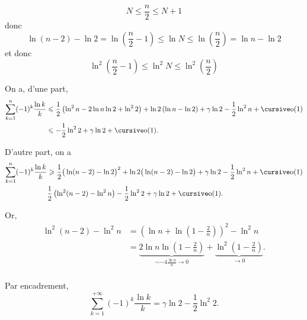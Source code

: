 \begin{enumerate}
		\[
			N \le \frac{n}{2}\le N+1
		\] donc \[
			\ln(n-2) - \ln 2 = \ln\left( \frac{n}{2} - 1 \right) \le \ln N \le \ln \left( \frac{n}{2} \right) = \ln n - \ln 2
		\] et donc \[
			\ln^2\left( \frac{n}{2} - 1 \right)  \le \ln^2 N \le \ln^2 \left(\frac{n}{2}\right)
		\]

		On a, d'une part,
		\begin{align*}
			\sum_{k=1}^n (-1)^k \frac{\ln k}{k} &\le \frac{1}{2}\left( \ln^2 n  - 2\ln n \ln 2 + \ln^2 2 \right) + \ln 2\left( \ln n - \ln 2 \right) + \gamma \ln 2 - \frac{1}{2}\ln^2 n + \po(1)\\
			&\le -\frac{1}{2} \ln^2 2 + \gamma \ln 2 + \po(1).
		\end{align*}

		D'autre part, on a
		\begin{align*}
			\sum_{k=1}^n (-1)^k \frac{\ln k}{k} &\ge \frac{1}{2}\big(\ln(n- 2) - \ln 2\big)^2 + \ln 2\big(\ln(n-2) - \ln 2\big) + \gamma \ln 2 - \frac{1}{2} \ln^2 n + \po(1)\\
			&\frac{1}{2}\left( \ln^2(n-2) - \ln^2 n \right) - \frac{1}{2} \ln^2 2 + \gamma \ln 2 + \po(1).
		\end{align*}

		Or,
		\begin{align*}
			\ln^2(n-2) - \ln^2 n &= \left( \ln n + \ln \left( 1 - \frac{2}{n} \right) \right)^2 - \ln^2 n\\
			&= \underbrace{2 \ln n \ln \left( 1- \frac{2}{n} \right)}_{\sim -4 \frac{\ln n}{n} \longrightarrow 0} + \underbrace{\ln^2\left( 1-\frac{2}{n} \right)}_{\longrightarrow 0}. \\
		\end{align*}

		Par encadrement, \[
			\sum_{k=1}^{+\infty} (-1)^k \frac{\ln k}{k} = \gamma \ln 2 - \frac{1}{2} \ln^2 2.
		\]
\end{enumerate}
